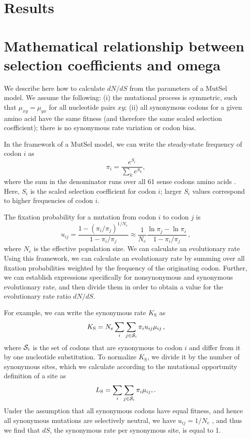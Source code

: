 \documentclass[11pt]{article}
\begin{document}
\section*{Results}


\section*{Mathematical relationship between selection coefficients and omega}


We describe here how to calculate $dN/dS$ from the parameters of a MutSel model. We assume the following: (i) the mutational process is symmetric, such that $\mu_{xy}=\mu_{yx}$ for all nucleotide pairs $xy$; (ii) all synonymous codons for a given amino acid have the same fitness (and therefore the same scaled selection coefficient); there is no synonymous rate variation or codon bias.

In the framework of a MutSel model, we can write the steady-state frequency of codon $i$ as
\begin{equation}\label{eq:pi_a}
 \pi_i=\frac{e^{S_i}}{\sum_k e^{S_k}},
\end{equation}
where the sum in the denominator runs over all 61 sense codons amino acids \cite{SellaHirsh2005}. Here, $S_i$ is the scaled selection coefficient for codon $i$; larger $S_i$ values correspond to higher frequencies of codon $i$. 

The fixation probability for a mutation from codon $i$ to codon $j$ is \cite{HalpernBruno1998,SellaHirsh2005}
\begin{equation}\label{eq:u_ij}
  u_{ij} = \frac{1-(\pi_i/\pi_j)^{1/N_e}}{1-\pi_i/\pi_j}
  \approx \frac{1}{N_e} \frac{\ln \pi_j - \ln \pi_i}{1-\pi_i/\pi_j}\,,
\end{equation}
where $N_e$ is the effective population size. We can calculate an evolutionary rate 
Using this framework, we can calculate an evolutionary rate by summing over all fixation probabilities weighted by the frequency of the originating codon. Further, we can establish expressions specifically for nonsynonymous and synonymous evolutionary rate, and then divide them in order to obtain a value for the evolutionary rate ratio $dN/dS$.

For example, we can write the synonymous rate $K_\text{S}$ as
\begin{equation}\label{eq:KS}
  K_\text{S} = N_e \sum_i \sum_{j \in {\cal S}_i} \pi_i  u_{ij}\mu_{ij}\,,
\end{equation}
where ${\cal S}_i$ is the set of codons that are synonymous to codon $i$ and differ from it by one nucleotide substitution. To normalize $K_\text{S}$, we divide it by the number of synonymous sites, which we calculate according to the mutational opportunity definition of a site \cite{GoldmanYang1994, Yang2006} as 
\begin{equation}\label{eq:LS}
  L_\text{S} = \sum_i \sum_{j \in {\cal S}_i} \pi_i \mu_{ij},.
\end{equation}
Under the assumption that all synonymous codons have equal fitness, and hence all synonymous mutations are selectively neutral, we have $u_{ij}=1/N_e$ \cite{CrowKimura1970}, and thus we find that $dS$, the synonymous rate per synonymous site, is equal to 1.
\end{document}
